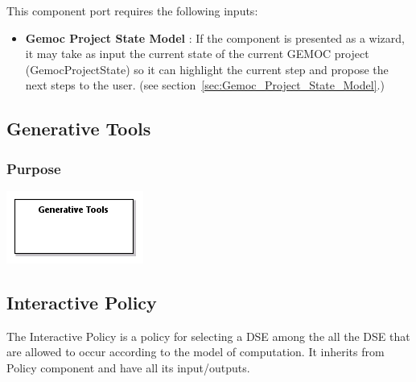 \documentclass{gemoc} %
\begin{document}
This component port requires the following inputs:
\begin{itemize}
  \item \textbf{Gemoc Project State Model} :
If the component is presented as a wizard, it may take as input the current state of the current GEMOC project (GemocProjectState) so it can highlight the current step and propose the next steps to the user.
(see section~\ref{sec:Gemoc_Project_State_Model}.)
\end{itemize}



\subsection{Generative Tools}
\label{sec:Generative_Tools}


\subsubsection{Purpose}


\begin{center}
\includegraphics*[trim=0.0cm 0.0cm 0cm 0.0cm, clip=true]{../images/generated/Generated_Generative_Tools.png}
\end{center}




\subsection{Interactive Policy}
\label{sec:Interactive_Policy}
The Interactive Policy is a policy for selecting a DSE among the all the DSE that are allowed to occur according to the model of computation.
It inherits from Policy component and have all its input/outputs.
\end{document}
